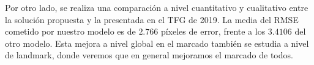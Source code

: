\medskip

\noindent Por otro lado, se realiza una comparación a nivel cuantitativo y cualitativo entre la solución propuesta y la presentada en el TFG de 2019. La media del RMSE cometido por nuestro modelo es de $2.766$ píxeles de error, frente a los $3.4106$ del otro modelo. Esta mejora a nivel global en el marcado también se estudia a nivel de landmark, donde veremos que en general mejoramos el marcado de todos.

\endinput
